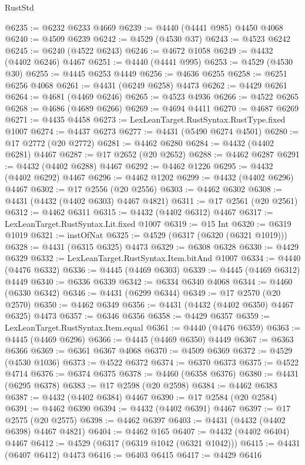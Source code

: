 \begin{lexlean}{RustStd}
\begin{coremodule}
@6235 := @6232 @6233 @4669
@6239 := @4440 (@4441 @985) @4450 @4068
@6240 := @4509 @6239
@6242 := @4529 (@4530 @37)
@6243 := @4523 @6242
@6245 := @6240 (@4522 @6243)
@6246 := @4672 @1058
@6249 := @4432 (@4402 @6246) @4467
@6251 := @4440 (@4441 @995)
@6253 := @4529 (@4530 @30)
@6255 := @4445 @6253 @4449
@6256 := @4636 @6255
@6258 := @6251 @6256 @4068
@6261 := @4431 (@6249 @6258) @4473
@6262 := @4429 @6261
@6264 := @4681 (@4469 @6246)
@6265 := @4523 @4936
@6266 := @4522 @6265
@6268 := @4686 (@4689 @6266)
@6269 := @4694 @4411
@6270 := @4687 @6269
@6271 := @4435 @4458
@6273 := LexLeanTarget.RustSyntax.RustType.fixed @1007
@6274 := @4437 @6273
@6277 := @4431 (@5490 @6274 @4501)
@6280 := @17 @2772 (@20 @2772)
@6281 := @4462 @6280
@6284 := @4432 (@4402 @6281) @4467
@6287 := @17 @2652 (@20 @2652)
@6288 := @4462 @6287
@6291 := @4432 (@4402 @6288) @4467
@6292 := @4462 @1226
@6295 := @4432 (@4402 @6292) @4467
@6296 := @4462 @1202
@6299 := @4432 (@4402 @6296) @4467
@6302 := @17 @2556 (@20 @2556)
@6303 := @4462 @6302
@6308 := @4431 (@4432 (@4402 @6303) @4467 @4821)
@6311 := @17 @2561 (@20 @2561)
@6312 := @4462 @6311
@6315 := @4432 (@4402 @6312) @4467
@6317 := LexLeanTarget.RustSyntax.Lit.fixed @1007
@6319 := @15 Int
@6320 := @6319 @1019
@6321 := instOfNat
@6325 := @4529 (@6317 (@6320 (@6321 @1019)))
@6328 := @4431 (@6315 @6325) @4473
@6329 := @6308 @6328
@6330 := @4429 @6329
@6332 := LexLeanTarget.RustSyntax.Item.bitAnd @1007
@6334 := @4440 (@4476 @6332)
@6336 := @4445 (@4469 @6303)
@6339 := @4445 (@4469 @6312) @4449
@6340 := @6336 @6339
@6342 := @6334 @6340 @4068
@6344 := @4460 (@6330 @6342)
@6346 := @4431 (@6299 @6344)
@6349 := @17 @2570 (@20 @2570)
@6350 := @4462 @6349
@6356 := @4431 (@4432 (@4402 @6350) @4467 @6325) @4473
@6357 := @6346 @6356
@6358 := @4429 @6357
@6359 := LexLeanTarget.RustSyntax.Item.equal
@6361 := @4440 (@4476 @6359)
@6363 := @4445 (@4469 @6296)
@6366 := @4445 (@4469 @6350) @4449
@6367 := @6363 @6366
@6369 := @6361 @6367 @4068
@6370 := @4509 @6369
@6372 := @4529 (@4530 @1036)
@6373 := @4522 @6372
@6374 := @6370 @6373
@6375 := @4522 @4714
@6376 := @6374 @6375
@6378 := @4460 (@6358 @6376)
@6380 := @4431 (@6295 @6378)
@6383 := @17 @2598 (@20 @2598)
@6384 := @4462 @6383
@6387 := @4432 (@4402 @6384) @4467
@6390 := @17 @2584 (@20 @2584)
@6391 := @4462 @6390
@6394 := @4432 (@4402 @6391) @4467
@6397 := @17 @2575 (@20 @2575)
@6398 := @4462 @6397
@6403 := @4431 (@4432 (@4402 @6398) @4467 @4821)
@6404 := @4462 @165
@6407 := @4432 (@4402 @6404) @4467
@6412 := @4529 (@6317 (@6319 @1042 (@6321 @1042)))
@6415 := @4431 (@6407 @6412) @4473
@6416 := @6403 @6415
@6417 := @4429 @6416

\end{coremodule}
\end{lexlean}
